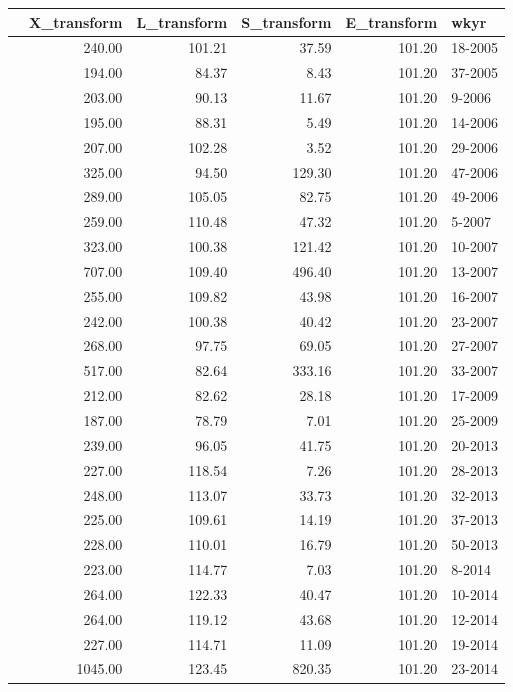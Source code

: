 \begin{table}[ht]
\centering
\begin{tabular}{rrrrrl}
  \hline
 & X\_transform & L\_transform & S\_transform & E\_transform & wkyr \\ 
  \hline
 & 240.00 & 101.21 & 37.59 & 101.20 & 18-2005 \\ 
 & 194.00 & 84.37 & 8.43 & 101.20 & 37-2005 \\ 
 & 203.00 & 90.13 & 11.67 & 101.20 & 9-2006 \\ 
 & 195.00 & 88.31 & 5.49 & 101.20 & 14-2006 \\ 
 & 207.00 & 102.28 & 3.52 & 101.20 & 29-2006 \\ 
 & 325.00 & 94.50 & 129.30 & 101.20 & 47-2006 \\ 
 & 289.00 & 105.05 & 82.75 & 101.20 & 49-2006 \\ 
 & 259.00 & 110.48 & 47.32 & 101.20 & 5-2007 \\ 
 & 323.00 & 100.38 & 121.42 & 101.20 & 10-2007 \\ 
 & 707.00 & 109.40 & 496.40 & 101.20 & 13-2007 \\ 
 & 255.00 & 109.82 & 43.98 & 101.20 & 16-2007 \\ 
 & 242.00 & 100.38 & 40.42 & 101.20 & 23-2007 \\ 
 & 268.00 & 97.75 & 69.05 & 101.20 & 27-2007 \\ 
 & 517.00 & 82.64 & 333.16 & 101.20 & 33-2007 \\ 
 & 212.00 & 82.62 & 28.18 & 101.20 & 17-2009 \\ 
 & 187.00 & 78.79 & 7.01 & 101.20 & 25-2009 \\ 
 & 239.00 & 96.05 & 41.75 & 101.20 & 20-2013 \\ 
 & 227.00 & 118.54 & 7.26 & 101.20 & 28-2013 \\ 
 & 248.00 & 113.07 & 33.73 & 101.20 & 32-2013 \\ 
 & 225.00 & 109.61 & 14.19 & 101.20 & 37-2013 \\ 
 & 228.00 & 110.01 & 16.79 & 101.20 & 50-2013 \\ 
 & 223.00 & 114.77 & 7.03 & 101.20 & 8-2014 \\ 
 & 264.00 & 122.33 & 40.47 & 101.20 & 10-2014 \\ 
 & 264.00 & 119.12 & 43.68 & 101.20 & 12-2014 \\ 
 & 227.00 & 114.71 & 11.09 & 101.20 & 19-2014 \\ 
 & 1045.00 & 123.45 & 820.35 & 101.20 & 23-2014 \\ 

\end{tabular}
\end{table}
